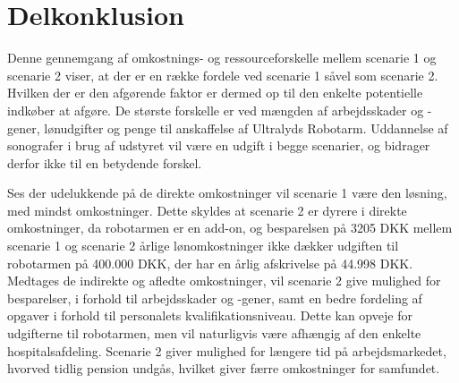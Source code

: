 \section{Delkonklusion}
Denne gennemgang af omkostnings- og ressourceforskelle mellem scenarie 1 og scenarie 2 viser, at der er en række fordele ved scenarie 1 såvel som scenarie 2. Hvilken der er den afgørende faktor er dermed op til den enkelte potentielle indkøber at afgøre. De største forskelle er ved mængden af arbejdsskader og -gener, lønudgifter og penge til anskaffelse af Ultralyds Robotarm. Uddannelse af sonografer i brug af udstyret vil være en udgift i begge scenarier, og bidrager derfor ikke til en betydende forskel. 

Ses der udelukkende på de direkte omkostninger vil scenarie 1 være den løsning, med mindst
omkostninger. Dette skyldes at scenarie 2 er dyrere i direkte omkostninger, da robotarmen er en
add-on, og besparelsen på 3205 DKK mellem scenarie 1 og scenarie 2 årlige lønomkostninger ikke dækker udgiften til robotarmen på 400.000 DKK, der har en årlig afskrivelse på 44.998 DKK. \\
Medtages de indirekte og afledte omkostninger, vil scenarie 2 give mulighed for besparelser, i forhold til arbejdsskader og -gener, samt en bedre fordeling af opgaver i forhold til personalets kvalifikationsniveau.  Dette kan opveje for udgifterne til robotarmen, men vil naturligvis være afhængig af den enkelte hospitalsafdeling. Scenarie 2 giver mulighed for længere tid på arbejdsmarkedet, hvorved tidlig pension undgås, hvilket giver færre omkostninger for samfundet.

